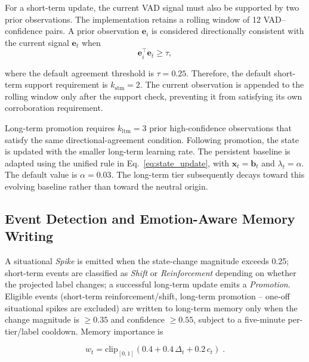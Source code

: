 \documentclass[graybox]{svmult}
\begin{document}
For a short-term update, the current VAD signal must also be supported by two
prior observations. The implementation retains a rolling window of 12
VAD--confidence pairs. A prior observation $\mathbf{e}_i$ is considered
directionally consistent with the current signal $\mathbf{e}_t$ when
\begin{equation}
\mathbf{e}_i^\top\mathbf{e}_t \geq \tau,
\label{eq:agreement}
\end{equation}


where the default agreement threshold is $\tau=0.25$. Therefore, the default
short-term support requirement is $k_{\mathrm{stm}}=2$. The current observation
is appended to the rolling window only after the support check, preventing it
from satisfying its own corroboration requirement.

Long-term promotion requires $k_{\mathrm{ltm}}=3$ prior high-confidence observations that
satisfy the same directional-agreement condition. Following promotion, the
state is updated with the smaller long-term learning rate. The persistent
baseline is adapted using the unified rule in Eq.~\ref{eq:state_update}, with
$\mathbf{x}_t=\mathbf{b}_t$ and $\lambda_t=\alpha$. The default value is
$\alpha=0.03$. The long-term tier subsequently decays toward this evolving
baseline rather than toward the neutral origin. 



\subsection{Event Detection and Emotion-Aware Memory Writing}
\label{sec:method-events}

A situational \emph{Spike} is emitted when the state-change magnitude exceeds 0.25; short-term events are classified as \emph{Shift} or \emph{Reinforcement} depending on whether the projected label changes; a successful long-term update emits a \emph{Promotion}. Eligible events (short-term reinforcement/shift, long-term promotion -- one-off situational spikes are excluded) are written to long-term memory only when the change magnitude is $\geq 0.35$ and confidence $\geq 0.55$, subject to a five-minute per-tier/label cooldown. Memory importance is

\begin{equation}
w_t = \mathrm{clip}_{[0,1]}\!\left(0.4 + 0.4\,\Delta_t + 0.2\,c_t\right)\;.
\label{eq:importance}
\end{equation}
\end{document}
